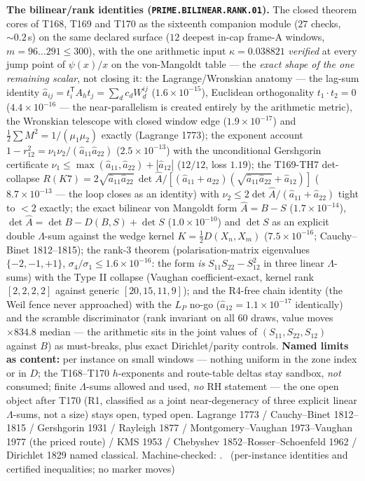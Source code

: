 \documentclass[11pt,a4paper]{article}
\theoremstyle{definition}
\begin{document}
\par\smallskip\noindent\textbf{The bilinear/rank identities
(\texttt{PRIME.BILINEAR.RANK.01}).}
The closed theorem cores of T168, T169 and T170 as the sixteenth
companion module ($27$ checks, ${\sim}0.2$\,s) on the same declared
surface ($12$ deepest in-cap frame-A windows, $m=96\ldots291\le300$),
with the one arithmetic input $\kappa=0.038821$ \emph{verified} at every
jump point of $\psi(x)/x$ on the von-Mangoldt table --- the \emph{exact
shape of the one remaining scalar}, not closing it: the
Lagrange/Wronskian anatomy --- the lag-sum identity
$\hat a_{ij}=t_i^{\mathsf T}A_ht_j=\sum_d c_dW^{ij}_d$
($1.6\times10^{-15}$), Euclidean orthogonality $t_1\cdot t_2=0$
($4.4\times10^{-16}$ --- the near-parallelism is created entirely by the
arithmetic metric), the Wronskian telescope with closed window edge
($1.9\times10^{-17}$) and $\tfrac12\sum M^2=1/(\mu_1\mu_2)$ exactly
(Lagrange 1773); the exponent account
$1-r_{12}^2=\nu_1\nu_2/(\hat a_{11}\hat a_{22})$ ($2.5\times10^{-13}$)
with the unconditional Gershgorin certificate
$\nu_1\le\max(\hat a_{11},\hat a_{22})+|\hat a_{12}|$ ($12/12$, loss
$1.19$); the T169-TH7 det-collapse
$R(K7)=2\sqrt{\hat a_{11}\hat a_{22}}\,\det\hat A/[(\hat a_{11}+
\hat a_{22})(\sqrt{\hat a_{11}\hat a_{22}}+\hat a_{12})]$
($8.7\times10^{-13}$ --- the loop closes as an identity) with
$\nu_2\le2\det\hat A/(\hat a_{11}+\hat a_{22})$ tight to $<2$ exactly;
the exact bilinear von Mangoldt form $\hat A=B-S$
($1.7\times10^{-14}$), $\det\hat A=\det B-D(B,S)+\det S$
($1.0\times10^{-10}$) and $\det S$ as an explicit double $\Lambda$-sum
against the wedge kernel $K=\tfrac12D(X_n,X_m)$ ($7.5\times10^{-16}$;
Cauchy--Binet 1812--1815); the rank-3 theorem (polarisation-matrix
eigenvalues $\{-2,-1,+1\}$, $\sigma_4/\sigma_1\le1.6\times10^{-16}$: the
form \emph{is} $S_{11}S_{22}-S_{12}^2$ in three linear $\Lambda$-sums)
with the Type II collapse (Vaughan coefficient-exact, kernel rank
$[2,2,2,2]$ against generic $[20,15,11,9]$); and the R4-free chain
identity (the Weil fence never approached) with the $L_P$ no-go
($\hat a_{12}=1.1\times10^{-17}$ identically) and the scramble
discriminator (rank invariant on all $60$ draws, value moves
$\times834.8$ median --- the arithmetic sits in the joint values of
$(S_{11},S_{22},S_{12})$ against $B$) as must-breaks, plus exact
Dirichlet/parity controls.
\textbf{Named limits as content:} per instance on small windows ---
nothing uniform in the zone index or in $D$; the T168--T170 $h$-exponents
and route-table deltas stay sandbox, \emph{not} consumed; finite
$\Lambda$-sums allowed and used, \emph{no} RH statement --- the one open
object after T170 (R1, classified as a joint near-degeneracy of three
explicit linear $\Lambda$-sums, not a size) stays open, typed open.
Lagrange 1773 / Cauchy--Binet 1812--1815 / Gershgorin 1931 / Rayleigh
1877 / Montgomery--Vaughan 1973--Vaughan 1977 (the priced route) / KMS
1953 / Chebyshev 1852--Rosser--Schoenfeld 1962 / Dirichlet 1829 named
classical. Machine-checked:
.
\mE\ (per-instance identities and certified inequalities; no marker moves)
\par\smallskip
\end{document}

